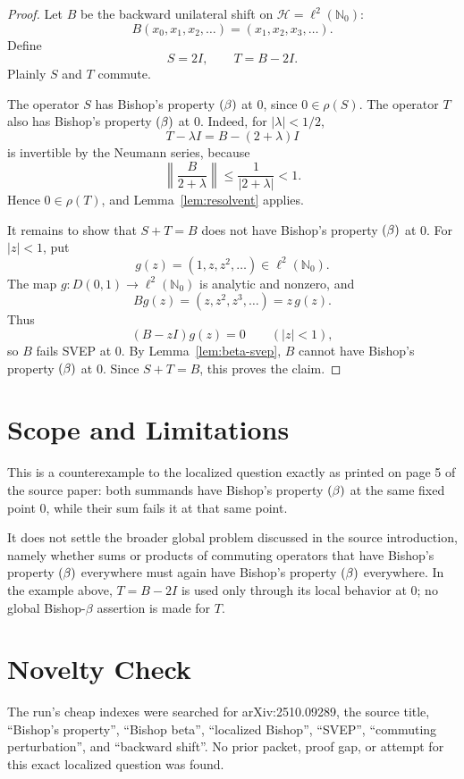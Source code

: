 \documentclass[11pt]{article}
\newcommand{\N}{\mathbb N}
\newcommand{\HH}{\mathcal H}
\newcommand{\bprop}{\textup{(}\beta\textup{)}}
\begin{document}
\begin{proof}
Let \(B\) be the backward unilateral shift on
\(\HH=\ell^2(\N_0)\):
\[
   B(x_0,x_1,x_2,\ldots)=(x_1,x_2,x_3,\ldots).
\]
Define
\[
   S=2I,\qquad T=B-2I.
\]
Plainly \(S\) and \(T\) commute.

The operator \(S\) has Bishop's property \(\bprop\) at \(0\), since \(0\in
\rho(S)\).  The operator \(T\) also has Bishop's property \(\bprop\) at \(0\).
Indeed, for \(|\lambda|<1/2\),
\[
  T-\lambda I = B-(2+\lambda)I
\]
is invertible by the Neumann series, because
\[
   \left\|\frac{B}{2+\lambda}\right\|
   \le \frac{1}{|2+\lambda|}
   < 1.
\]
Hence \(0\in\rho(T)\), and Lemma~\ref{lem:resolvent} applies.

It remains to show that \(S+T=B\) does not have Bishop's property \(\bprop\)
at \(0\).  For \(|z|<1\), put
\[
   g(z)=(1,z,z^2,\ldots)\in\ell^2(\N_0).
\]
The map \(g:D(0,1)\to\ell^2(\N_0)\) is analytic and nonzero, and
\[
   Bg(z)=(z,z^2,z^3,\ldots)=z\,g(z).
\]
Thus
\[
   (B-zI)g(z)=0\qquad(|z|<1),
\]
so \(B\) fails SVEP at \(0\).  By Lemma~\ref{lem:beta-svep}, \(B\) cannot
have Bishop's property \(\bprop\) at \(0\).  Since \(S+T=B\), this proves the
claim.
\end{proof}

\section*{Scope and Limitations}

This is a counterexample to the localized question exactly as printed on page
5 of the source paper: both summands have Bishop's property \(\bprop\) at the
same fixed point \(0\), while their sum fails it at that same point.

It does not settle the broader global problem discussed in the source
introduction, namely whether sums or products of commuting operators that have
Bishop's property \(\bprop\) everywhere must again have Bishop's property
\(\bprop\) everywhere.  In the example above, \(T=B-2I\) is used only through
its local behavior at \(0\); no global Bishop-\(\beta\) assertion is made for
\(T\).

\section*{Novelty Check}

The run's cheap indexes were searched for arXiv:2510.09289, the source title,
``Bishop's property'', ``Bishop beta'', ``localized Bishop'', ``SVEP'',
``commuting perturbation'', and ``backward shift''.  No prior packet, proof
gap, or attempt for this exact localized question was found.
\end{document}
